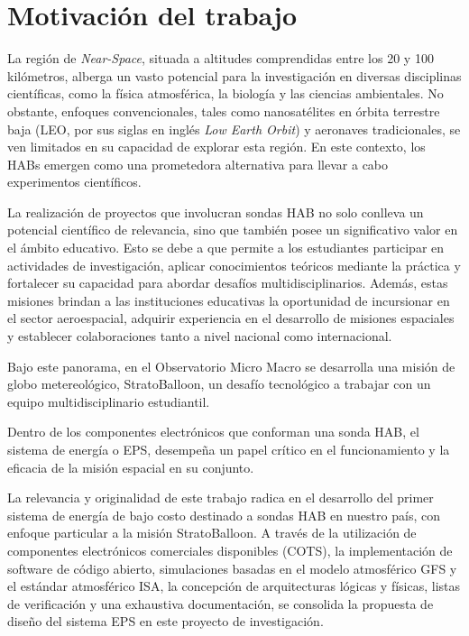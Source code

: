 \newpage
\section{Motivación del trabajo}
\vspace{1 cm}
La región de \emph{Near-Space}, situada a altitudes comprendidas entre los 20 y 100 kilómetros, alberga un vasto potencial para la investigación en diversas disciplinas científicas, como la física atmosférica, la biología y las ciencias ambientales. No obstante, enfoques convencionales, tales como nanosatélites en órbita terrestre baja (LEO, por sus siglas en inglés \emph{Low Earth Orbit}) y aeronaves tradicionales, se ven limitados en su capacidad de explorar esta región. En este contexto, los HABs emergen como una prometedora alternativa para llevar a cabo experimentos científicos.

La realización de proyectos que involucran sondas HAB no solo conlleva un potencial científico de relevancia, sino que también posee un significativo valor en el ámbito educativo. Esto se debe a que permite a los estudiantes participar en actividades de investigación, aplicar conocimientos teóricos mediante la práctica y fortalecer su capacidad para abordar desafíos multidisciplinarios. Además, estas misiones brindan a las instituciones educativas la oportunidad de incursionar en el sector aeroespacial, adquirir experiencia en el desarrollo de misiones espaciales y establecer colaboraciones tanto a nivel nacional como internacional.

Bajo este panorama, en el Observatorio Micro Macro se desarrolla una misión de globo metereológico, StratoBalloon, un desafío tecnológico a trabajar con un equipo multidisciplinario estudiantil.

Dentro de los componentes electrónicos que conforman una sonda HAB, el sistema de energía o EPS, desempeña un papel crítico en el funcionamiento y la eficacia de la misión espacial en su conjunto.

La relevancia y originalidad de este trabajo radica en el desarrollo del primer sistema de energía de bajo costo destinado a sondas HAB en nuestro país, con enfoque particular a la misión StratoBalloon. A través de la utilización de componentes electrónicos comerciales disponibles (COTS), la implementación de software de código abierto, simulaciones basadas en el modelo atmosférico GFS y el estándar atmosférico ISA, la concepción de arquitecturas lógicas y físicas, listas de verificación y una exhaustiva documentación, se consolida la propuesta de diseño del sistema EPS en este proyecto de investigación.


